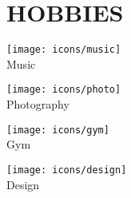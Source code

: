 \section*{\MakeUppercase{Hobbies}}

\begin{minipage}[t]{.15\textwidth}
	\centering
	\vbox{\texttt{[image: icons/music]}\\[4pt]Music}
\end{minipage}
\begin{minipage}[t]{.2\textwidth}
	\centering
	\vbox{\texttt{[image: icons/photo]}\\[4pt]Photography}
\end{minipage}
\begin{minipage}[t]{.15\textwidth}
	\centering
	\vbox{\texttt{[image: icons/gym]}\\[4pt]Gym}
\end{minipage}
\begin{minipage}[t]{.15\textwidth}
	\centering
	\vbox{\texttt{[image: icons/design]}\\[4pt]Design}
\end{minipage}
